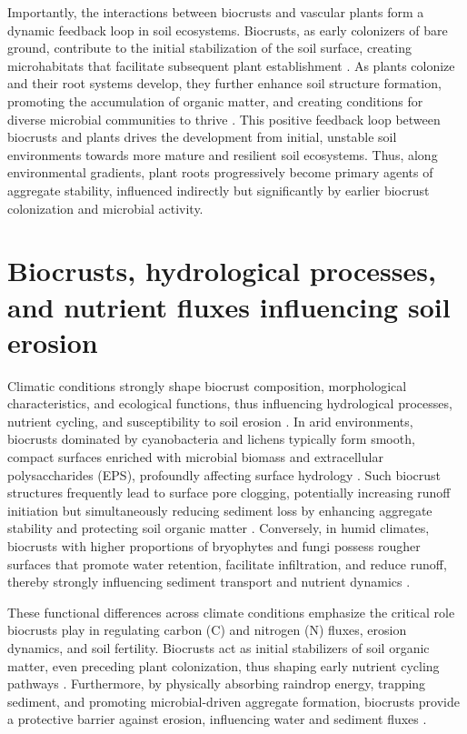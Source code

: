 Importantly, the interactions between biocrusts and vascular plants form a dynamic feedback loop in soil ecosystems. Biocrusts, as early colonizers of bare ground, contribute to the initial stabilization of the soil surface, creating microhabitats that facilitate subsequent plant establishment \citep{BelnapBudel2016,Bowker2006}. As plants colonize and their root systems develop, they further enhance soil structure formation, promoting the accumulation of organic matter, and creating conditions for diverse microbial communities to thrive \citep{Schweizer2018,Six2004}. This positive feedback loop between biocrusts and plants drives the development from initial, unstable soil environments towards more mature and resilient soil ecosystems. Thus, along environmental gradients, plant roots progressively become primary agents of aggregate stability, influenced indirectly but significantly by earlier biocrust colonization and microbial activity.

\section{Biocrusts, hydrological processes, and nutrient fluxes influencing soil erosion}
\label{sec:BiocrustFluxes}

Climatic conditions strongly shape biocrust composition, morphological characteristics, and ecological functions, thus influencing hydrological processes, nutrient cycling, and susceptibility to soil erosion \citep{Belnap2003,ConcostrinaZubiri2014}. In arid environments, biocrusts dominated by cyanobacteria and lichens typically form smooth, compact surfaces enriched with microbial biomass and extracellular polysaccharides (EPS), profoundly affecting surface hydrology \citep{RodriguezCaballero2018,Weber2022}. Such biocrust structures frequently lead to surface pore clogging, potentially increasing runoff initiation but simultaneously reducing sediment loss by enhancing aggregate stability and protecting soil organic matter \citep{Kidron2021}. Conversely, in humid climates, biocrusts with higher proportions of bryophytes and fungi possess rougher surfaces that promote water retention, facilitate infiltration, and reduce runoff, thereby strongly influencing sediment transport and nutrient dynamics \citep{RiverasMunoz2022,Seitz2017}.

These functional differences across climate conditions emphasize the critical role biocrusts play in regulating carbon (C) and nitrogen (N) fluxes, erosion dynamics, and soil fertility. Biocrusts act as initial stabilizers of soil organic matter, even preceding plant colonization, thus shaping early nutrient cycling pathways \citep{Belnap2007,Young2022}. Furthermore, by physically absorbing raindrop energy, trapping sediment, and promoting microbial-driven aggregate formation, biocrusts provide a protective barrier against erosion, influencing water and sediment fluxes \citep{Costa2018,Xiao2022}.

